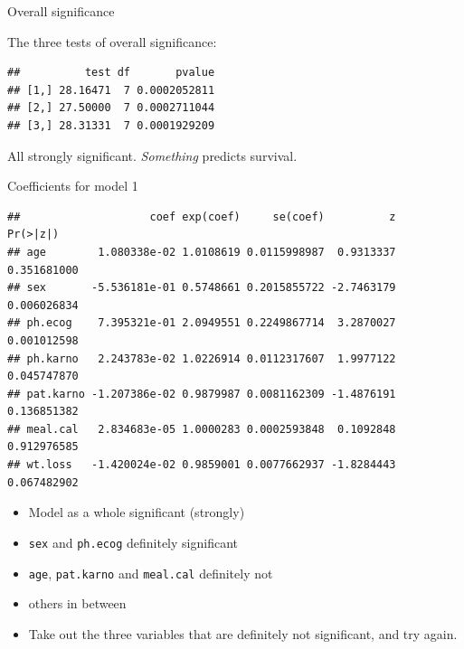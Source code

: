 \begin{frame}[fragile]{Overall significance}
 

The three tests of overall significance:

 
\begin{knitrout}
\color{fgcolor}\begin{kframe}
\begin{alltt}
\hlkwb{=}
\hlopt{$}\hlopt{$}\hlopt{$}
\end{alltt}
\begin{verbatim}
##          test df       pvalue
## [1,] 28.16471  7 0.0002052811
## [2,] 27.50000  7 0.0002711044
## [3,] 28.31331  7 0.0001929209
\end{verbatim}
\end{kframe}
\end{knitrout}

All strongly significant. \emph{Something} predicts survival.  

\end{frame}

\begin{frame}[fragile]{Coefficients for model 1}
  
{\footnotesize  
 
\begin{knitrout}
\color{fgcolor}\begin{kframe}
\begin{alltt}
\hlopt{$}
\end{alltt}
\begin{verbatim}
##                    coef exp(coef)     se(coef)          z    Pr(>|z|)
## age        1.080338e-02 1.0108619 0.0115998987  0.9313337 0.351681000
## sex       -5.536181e-01 0.5748661 0.2015855722 -2.7463179 0.006026834
## ph.ecog    7.395321e-01 2.0949551 0.2249867714  3.2870027 0.001012598
## ph.karno   2.243783e-02 1.0226914 0.0112317607  1.9977122 0.045747870
## pat.karno -1.207386e-02 0.9879987 0.0081162309 -1.4876191 0.136851382
## meal.cal   2.834683e-05 1.0000283 0.0002593848  0.1092848 0.912976585
## wt.loss   -1.420024e-02 0.9859001 0.0077662937 -1.8284443 0.067482902
\end{verbatim}
\end{kframe}
\end{knitrout}
}

  \begin{itemize}
  \item Model as a whole significant (strongly)
  \item \texttt{sex} and
\texttt{ph.ecog} definitely significant
\item \texttt{age}, \texttt{pat.karno} and
\texttt{meal.cal} definitely not
\item  others in
between
\item Take out the three variables that are definitely not
significant, and try again.
  \end{itemize}


\end{frame}


